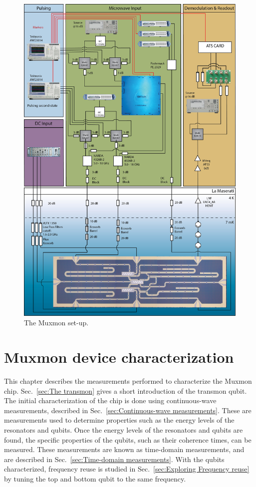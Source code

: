       \begin{figure}[tb]
        \centering
        \includegraphics[width=.9\textwidth]{Figures/20150512_Muxmon_Setup.jpg}
        \caption{The Muxmon set-up.}
        \label{fig:Muxmon set-up}
      \end{figure}
  \chapter{Muxmon device characterization}
    \label{ch:Muxmon device characterization}

    This chapter describes the measurements performed to characterize the Muxmon chip. Sec.~\ref{sec:The transmon} gives a short introduction of the transmon qubit. The initial characterization of the chip is done using continuous-wave measurements, described in Sec.~\ref{sec:Continuous-wave measurements}. These are measurements used to determine properties such as the energy levels of the resonators and qubits. Once the energy levels of the resonators and qubits are found, the specific properties of the qubits, such as their coherence times, can be measured. These measurements are known as time-domain measurements, and are described in Sec.~\ref{sec:Time-domain measurements}. With the qubits characterized, frequency reuse is studied in Sec.~\ref{sec:Exploring Frequency reuse} by tuning the top and bottom qubit to the same frequency.

